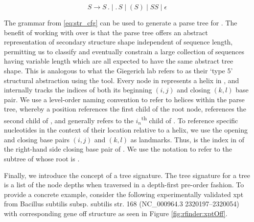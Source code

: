 \begin{equation} \label{eq:str_cfg}
S \rightarrow S\,.\;|\;.\,S\;|\;(S)\;|\;SS\;|\;\epsilon
\end{equation}

The grammar from \eqref{eq:str_cfg} can be used to generate a parse tree \tree for \strS. The benefit of working with \tree over \strS is that the parse tree offers an abstract representation of secondary structure shape independent of sequence length, permitting us to classify and eventually constrain a large collection of sequences having variable length which are all expected to have the same abstract tree shape. This is analogous to what the Giegerich lab refers to as their `type 5' structural abstraction using the \rshapes tool. Every node in \tree represents a helix in \strS, and internally tracks the indices of both its beginning $(i,j)$ and closing $(k,l)$ base pair. We use a level-order naming convention to refer to helices within the parse tree, whereby a position  references the first child of the root node,  references the second child of , and generally  refers to the $i_n$\textsuperscript{th} child of . To reference specific nucleotides in the context of their location relative to a helix, we use the opening and closing base pairs $(i,j)$ and $(k,l)$ as landmarks. Thus,  is the index in \strS of the right-hand side closing base pair of . We use the notation  to refer to the subtree of \tree whose root is .

Finally, we introduce the concept of a tree signature. The tree signature for a tree \tree is a list of the node depths when traversed in a depth-first pre-order fashion. To provide a concrete example, consider the following experimentally validated xpt \grb from Bacillus subtilis subsp. subtilis str. 168 (NC\_000964.3 2320197--2320054) with corresponding gene off structure as seen in Figure \ref{fig:rfinder:xptOff}.
\medskip

